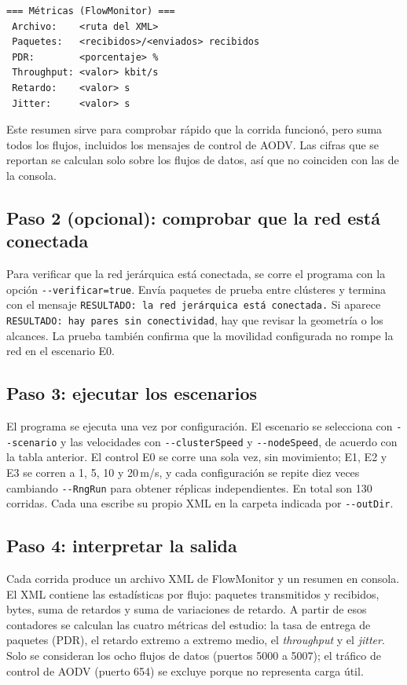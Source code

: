\begin{verbatim}
=== Métricas (FlowMonitor) ===
 Archivo:    <ruta del XML>
 Paquetes:   <recibidos>/<enviados> recibidos
 PDR:        <porcentaje> %
 Throughput: <valor> kbit/s
 Retardo:    <valor> s
 Jitter:     <valor> s
\end{verbatim}

Este resumen sirve para comprobar rápido que la corrida funcionó, pero suma todos los
flujos, incluidos los mensajes de control de AODV. Las cifras que se reportan se calculan
solo sobre los flujos de datos, así que no coinciden con las de la consola.

\subsection{Paso 2 (opcional): comprobar que la red está conectada}

Para verificar que la red jerárquica está conectada, se corre el programa con la opción
\texttt{-{}-verificar=true}. Envía paquetes de prueba entre clústeres y termina con el
mensaje \texttt{RESULTADO: la red jerárquica está conectada.} Si aparece
\texttt{RESULTADO: hay pares sin conectividad}, hay que revisar la geometría o los
alcances. La prueba también confirma que la movilidad configurada no rompe la red en el
escenario E0.

\subsection{Paso 3: ejecutar los escenarios}

El programa se ejecuta una vez por configuración. El escenario se selecciona con
\texttt{-{}-scenario} y las velocidades con \texttt{-{}-clusterSpeed} y
\texttt{-{}-nodeSpeed}, de acuerdo con la tabla anterior. El control E0 se corre una sola
vez, sin movimiento; E1, E2 y E3 se corren a 1, 5, 10 y 20\,m/s, y cada configuración se
repite diez veces cambiando \texttt{-{}-RngRun} para obtener réplicas independientes. En
total son 130 corridas. Cada una escribe su propio XML en la carpeta indicada por
\texttt{-{}-outDir}.

\subsection{Paso 4: interpretar la salida}

Cada corrida produce un archivo XML de FlowMonitor y un resumen en consola. El XML
contiene las estadísticas por flujo: paquetes transmitidos y recibidos, bytes, suma de
retardos y suma de variaciones de retardo. A partir de esos contadores se calculan las
cuatro métricas del estudio: la tasa de entrega de paquetes (PDR), el retardo extremo a
extremo medio, el \emph{throughput} y el \emph{jitter}. Solo se consideran los ocho flujos
de datos (puertos 5000 a 5007); el tráfico de control de AODV (puerto 654) se excluye
porque no representa carga útil.

